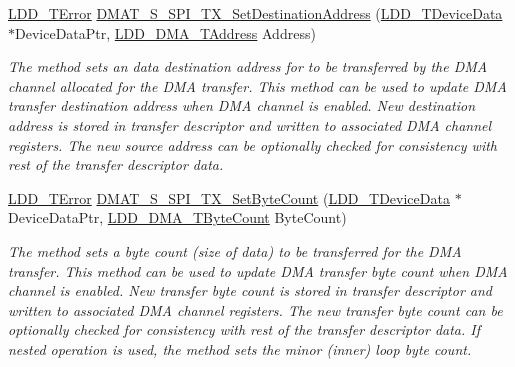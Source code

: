 \begin{DoxyCompactItemize}
\hyperlink{group___p_e___types__module_ga24c2b045fd04e79e85f261ce4df35588}{L\-D\-D\-\_\-\-T\-Error} \hyperlink{group___d_m_a_t___s___s_p_i___t_x__module_ga1b996683c666a693497a501342eb2f5a}{D\-M\-A\-T\-\_\-\-S\-\_\-\-S\-P\-I\-\_\-\-T\-X\-\_\-\-Set\-Destination\-Address} (\hyperlink{group___p_e___types__module_gac5cf1362f1f0e3a2ce71b1bf2276d091}{L\-D\-D\-\_\-\-T\-Device\-Data} $\ast$Device\-Data\-Ptr, \hyperlink{group___p_e___types__module_gab8287f62db7ff96992355760b652cd07}{L\-D\-D\-\_\-\-D\-M\-A\-\_\-\-T\-Address} Address)
\begin{DoxyCompactList}\small\item\em The method sets an data destination address for to be transferred by the D\-M\-A channel allocated for the D\-M\-A transfer. This method can be used to update D\-M\-A transfer destination address when D\-M\-A channel is enabled. New destination address is stored in transfer descriptor and written to associated D\-M\-A channel registers. The new source address can be optionally checked for consistency with rest of the transfer descriptor data. \end{DoxyCompactList}\item 
\hyperlink{group___p_e___types__module_ga24c2b045fd04e79e85f261ce4df35588}{L\-D\-D\-\_\-\-T\-Error} \hyperlink{group___d_m_a_t___s___s_p_i___t_x__module_ga9ca924020e8d20b12c110a6a1a83a78a}{D\-M\-A\-T\-\_\-\-S\-\_\-\-S\-P\-I\-\_\-\-T\-X\-\_\-\-Set\-Byte\-Count} (\hyperlink{group___p_e___types__module_gac5cf1362f1f0e3a2ce71b1bf2276d091}{L\-D\-D\-\_\-\-T\-Device\-Data} $\ast$Device\-Data\-Ptr, \hyperlink{group___p_e___types__module_gac001a681eb67942fa78ac9b62ba3b0d6}{L\-D\-D\-\_\-\-D\-M\-A\-\_\-\-T\-Byte\-Count} Byte\-Count)
\begin{DoxyCompactList}\small\item\em The method sets a byte count (size of data) to be transferred for the D\-M\-A transfer. This method can be used to update D\-M\-A transfer byte count when D\-M\-A channel is enabled. New transfer byte count is stored in transfer descriptor and written to associated D\-M\-A channel registers. The new transfer byte count can be optionally checked for consistency with rest of the transfer descriptor data. If nested operation is used, the method sets the minor (inner) loop byte count. \end{DoxyCompactList}\end{DoxyCompactItemize}
